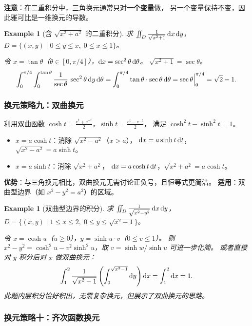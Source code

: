 \documentclass{ctexart}
\newtheorem{example}[theorem]{Example}
\begin{document}
\textbf{注意}：在二重积分中，三角换元通常只对\textbf{一个变量}做，
另一个变量保持不变，因此雅可比是一维换元的导数。

\begin{example}[含 $\sqrt{x^2 + a^2}$ 的二重积分]
  求 $\iint_D \frac{1}{\sqrt{x^2+1}}\,\mathrm{d} x\,\mathrm{d} y$，
  $D = \{(x,y) \mid 0 \le y \le x,\; 0 \le x \le 1\}$。

  令 $x = \tan\theta$（$\theta \in [0, \pi/4]$），$\mathrm{d} x = \sec^2\theta\,\mathrm{d}\theta$。
  $\sqrt{x^2+1} = \sec\theta$。
  \[
    \int_0^{\pi/4}\int_0^{\tan\theta} \frac{1}{\sec\theta}\,\sec^2\theta\,\mathrm{d} y\,\mathrm{d}\theta
    = \int_0^{\pi/4} \tan\theta \cdot \sec\theta \,\mathrm{d}\theta
    = \sec\theta\Big|_0^{\pi/4} = \sqrt{2} - 1.
  \]
\end{example}

\subsubsection*{换元策略九：双曲换元}

利用双曲函数 $\cosh t = \frac{e^t+e^{-t}}{2}$，$\sinh t = \frac{e^t-e^{-t}}{2}$，
满足 $\cosh^2 t - \sinh^2 t = 1$。

\begin{itemize}
  \item $x = a\cosh t$：消除 $\sqrt{x^2 - a^2}$（$x > a$），
    $\mathrm{d} x = a\sinh t\,\mathrm{d} t$，$\sqrt{x^2-a^2} = a\sinh t$。
  \item $x = a\sinh t$：消除 $\sqrt{x^2 + a^2}$，
    $\mathrm{d} x = a\cosh t\,\mathrm{d} t$，$\sqrt{x^2+a^2} = a\cosh t$。
\end{itemize}

\textbf{优势}：与三角换元相比，双曲换元无需讨论正负号，且恒等式更简洁。
\textbf{适用}：双曲型边界（如 $x^2 - y^2 = a^2$）的区域。

\begin{example}[双曲型边界的积分]
  求 $\iint_D \frac{1}{\sqrt{x^2-y^2}}\,\mathrm{d} x\,\mathrm{d} y$，
  $D = \{(x,y) \mid 1 \le x \le 2,\; 0 \le y \le \sqrt{x^2-1}\}$。

  令 $x = \cosh u$（$u \ge 0$），$y = \sinh u \cdot v$（$0 \le v \le 1$）。
  则 $x^2 - y^2 = \cosh^2 u - v^2\sinh^2 u$，取 $v = \sinh w/\sinh u$ 可进一步化简。
  或者直接对 $y$ 积分后对 $x$ 做双曲换元：
  \[
    \int_1^2 \frac{1}{\sqrt{x^2-1}}\left(\int_0^{\sqrt{x^2-1}} \mathrm{d} y\right)\mathrm{d} x
    = \int_1^2 \mathrm{d} x = 1.
  \]
  此题内层积分恰好积出，无需复杂换元，但展示了双曲换元的思路。
\end{example}

\subsubsection*{换元策略十：齐次函数换元}
\end{document}
